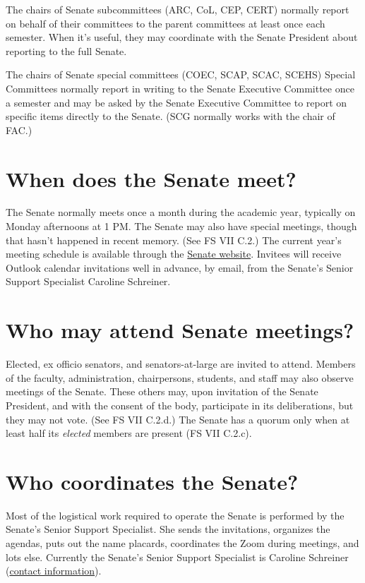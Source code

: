 \documentclass[12pt]{article}
\begin{document}
The chairs of Senate subcommittees (ARC, CoL, CEP, CERT) normally report
on behalf of their committees to the parent committees at least once
each semester. When it's useful, they may coordinate with the Senate
President about reporting to the full Senate.

The chairs of Senate special committees (COEC, SCAP, SCAC, SCEHS)
Special Committees normally report in writing to the Senate Executive
Committee once a semester and may be asked by the Senate Executive
Committee to report on specific items directly to the Senate. (SCG
normally works with the chair of FAC.)

\section{When does the Senate meet?}\label{when-does-the-senate-meet}

The Senate normally meets once a month during the academic year,
typically on Monday afternoons at 1 PM. The Senate may also have special
meetings, though that hasn't happened in recent memory. (See FS VII
C.2.) The current year's meeting schedule is available through the
\href{https://www.hofstra.edu/senate/}{Senate website}. Invitees will
receive Outlook calendar invitations well in advance, by email, from the
Senate's Senior Support Specialist Caroline Schreiner.

\section{Who may attend Senate
meetings?}\label{who-may-attend-senate-meetings}

Elected, ex officio senators, and senators-at-large are invited to
attend. Members of the faculty, administration, chairpersons, students,
and staff may also observe meetings of the Senate. These others may,
upon invitation of the Senate President, and with the consent of the
body, participate in its deliberations, but they may not vote. (See FS
VII C.2.d.) The Senate has a quorum only when at least half its
\emph{elected} members are present (FS VII C.2.c).

\section{Who coordinates the Senate?}\label{who-coordinates-the-senate}

Most of the logistical work required to operate the Senate is performed
by the Senate's Senior Support Specialist. She sends the invitations,
organizes the agendas, puts out the name placards, coordinates the Zoom
during meetings, and lots else. Currently the Senate's Senior Support
Specialist is Caroline Schreiner
(\href{https://www.hofstra.edu/senate/}{contact information}).
\end{document}
